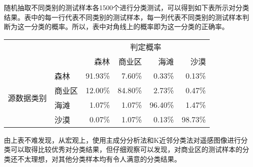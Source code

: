 随机抽取不同类别的测试样本各1500个进行分类测试，可以得到如下表所示对分类结果。表中的每一行代表不同类别的测试样本，每一列代表不同类别的测试样本判断为这一分类的概率。所以，表中对角线上的概率即为这一分类的正确率。
\begin{center}
\begin{tabular}{ll|rrrr}
	\toprule
	&&\multicolumn{4}{c}{判定概率} \\
	 & & 森林 & 商业区 & 海滩 & 沙漠 \\
	 \midrule
	 \multirow{4}{*}{源数据类别} & 森林 & 91.93\% & 7.60\% & 0.33\% & 0.13\% \\
	  & 商业区 & 12.00\% & 84.80\% & 2.73\% & 0.47\% \\
	  & 海滩 & 1.07\% & 1.07\% & 96.40\% & 1.47\% \\
	  & 沙漠 & 0.07\% & 1.07\% & 0.13\% & 98.73\% \\
	 \bottomrule
\end{tabular}
\end{center}
由上表不难发现，从宏观上，使用主成分分析法和K近邻分类法对遥感图像进行分类可以取得比较优秀对分类结果，但仔细观察可以发现，对商业区的测试样本的分类还不太理想，对其他分类样本均有令人满意的分类结果。